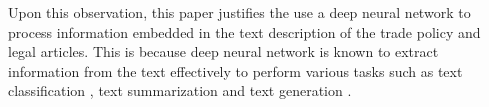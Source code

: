 Upon this observation, this paper justifies the use a deep neural network to process information embedded in the text description of the trade policy and legal articles. This is because deep neural network is known to 
extract information from the text effectively to perform various tasks such as text classification \citep{minaee2020deep}, text summarization \citep{textsum} and text generation \citep{guo2017long}.




